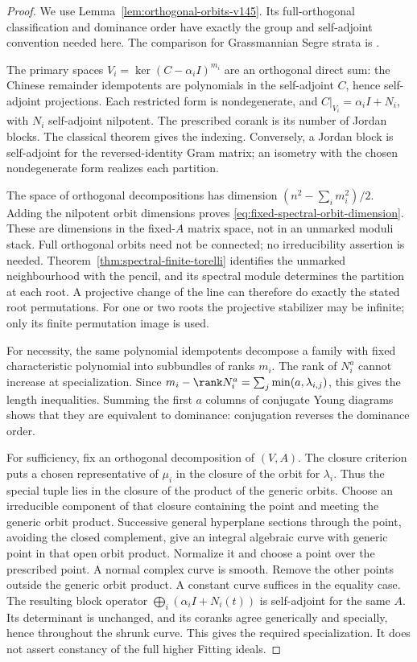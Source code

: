 \begin{proof}
We use Lemma~\ref{lem:orthogonal-orbits-v145}.  Its full-orthogonal
classification and dominance order have exactly the group and
self-adjoint convention needed here.  The comparison for Grassmannian
Segre strata is \cite[Theorem~5.1]{FevolaMandelshtamSturmfels}.

The primary spaces \(V_i=\ker(C-\alpha_iI)^{m_i}\) are an
orthogonal direct sum: the Chinese remainder idempotents are
polynomials in the self-adjoint \(C\), hence self-adjoint projections.
Each restricted form is nondegenerate, and
\(C|_{V_i}=\alpha_iI+N_i\), with \(N_i\) self-adjoint
nilpotent. The prescribed corank is its number of Jordan blocks.
The classical theorem gives the indexing. Conversely, a Jordan block
is self-adjoint for the reversed-identity Gram matrix; an isometry
with the chosen nondegenerate form realizes each partition.

The space of orthogonal decompositions has dimension
\((n^2-\sum_i m_i^2)/2\). Adding the nilpotent orbit dimensions
proves \eqref{eq:fixed-spectral-orbit-dimension}. These are dimensions
in the fixed-\(A\) matrix space, not in an unmarked moduli stack.
Full orthogonal orbits need not be connected; no irreducibility
assertion is needed. Theorem~\ref{thm:spectral-finite-torelli}
identifies the unmarked neighbourhood with the pencil, and its spectral
module determines the partition at each root. A projective change of
the line can therefore do exactly the stated root permutations.
For one or two roots the projective stabilizer may be infinite;
only its finite permutation image is used.

For necessity, the same polynomial idempotents decompose a family
with fixed characteristic polynomial into subbundles of ranks \(m_i\).
The rank of \(N_i^a\) cannot increase at specialization. Since
\(m_i-\rank N_i^a=\sum_j\min(a,\lambda_{i,j})\), this gives
the length inequalities. Summing the first \(a\) columns of
conjugate Young diagrams shows that they are equivalent to dominance:
conjugation reverses the dominance order.

For sufficiency, fix an orthogonal decomposition of \((V,A)\).
The closure criterion puts a chosen representative of \(\mu_i\)
in the closure of the orbit for \(\lambda_i\). Thus the special
tuple lies in the closure of the product of the generic orbits.
Choose an irreducible component of that closure containing the point
and meeting the generic orbit product. Successive general hyperplane
sections through the point, avoiding the closed complement, give an
integral algebraic curve with generic point in that open orbit product.
Normalize it and choose a point over the prescribed point. A normal
complex curve is smooth. Remove the other points outside the generic
orbit product. A constant curve suffices in the equality case.
The resulting block operator \(\bigoplus_i(\alpha_iI+N_i(t))\)
is self-adjoint for the same \(A\). Its determinant is unchanged,
and its coranks agree generically and specially, hence throughout the
shrunk curve. This gives the required specialization. It does not
assert constancy of the full higher Fitting ideals.


\end{proof}
